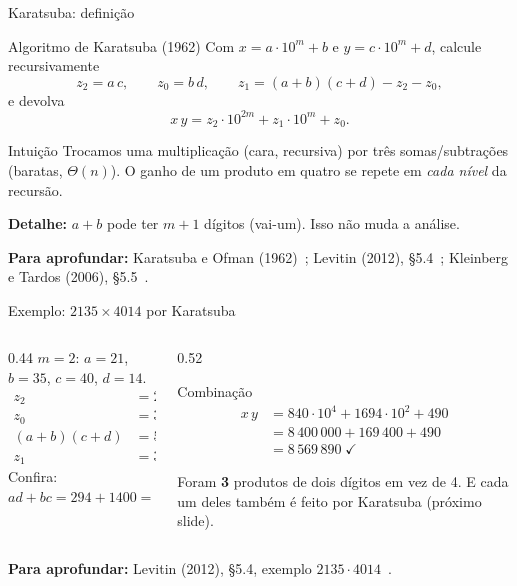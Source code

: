 \documentclass[aspectratio=169,xcolor=table]{beamer}
\newcommand{\fonte}[1]{%
  \vfill
  {\tiny\color{gray!55!black}\textbf{Para aprofundar:} #1\par}%
}
\begin{document}
\begin{frame}{Karatsuba: definição}
  \begin{block}{Algoritmo de Karatsuba (1962)}
    \scriptsize Com $x = a\cdot 10^m + b$ e $y = c\cdot 10^m + d$, calcule recursivamente
    \[
      z_2 = a\,c, \qquad z_0 = b\,d, \qquad z_1 = (a+b)(c+d) - z_2 - z_0,
    \]
    e devolva
    \[ x\,y = z_2\cdot 10^{2m} + z_1\cdot 10^m + z_0. \]
  \end{block}
  \begin{exampleblock}{Intuição}
    \scriptsize Trocamos uma multiplicação (cara, recursiva) por três somas/subtrações
    (baratas, $\Theta(n)$). O ganho de um produto em quatro se repete em \emph{cada nível}
    da recursão.
  \end{exampleblock}
  \scriptsize\textbf{Detalhe:} $a+b$ pode ter $m+1$ dígitos (vai-um). Isso não muda a análise.
  \fonte{Karatsuba e Ofman (1962)~\cite{karatsuba1963multiplication};
    Levitin (2012), \S 5.4~\cite{levitin2012introduction};
    Kleinberg e Tardos (2006), \S 5.5~\cite{kleinberg2006algorithm}.}
\end{frame}

\begin{frame}{Exemplo: $2135\times 4014$ por Karatsuba}
  \begin{columns}[T]
    \begin{column}{0.44\textwidth}
      \scriptsize
      $m=2$: \quad $a=21$, $b=35$, $c=40$, $d=14$.
      \[
        \begin{aligned}
          z_2 &= 21\cdot 40 = 840\\
          z_0 &= 35\cdot 14 = 490\\
          (a+b)(c+d) &= 56\cdot 54 = 3024\\
          z_1 &= 3024 - 840 - 490 = 1694
        \end{aligned}
      \]
      Confira: $ad+bc = 294+1400 = 1694$ \checkmark
    \end{column}
    \begin{column}{0.52\textwidth}
      \begin{exampleblock}{Combinação}
        \scriptsize
        \[
          \begin{aligned}
            x\,y &= 840\cdot 10^4 + 1694\cdot 10^2 + 490\\
                 &= 8\,400\,000 + 169\,400 + 490\\
                 &= 8\,569\,890 \;\checkmark
          \end{aligned}
        \]
      \end{exampleblock}
      \scriptsize Foram \textbf{3} produtos de dois dígitos em vez de 4. E cada um deles
      também é feito por Karatsuba (próximo slide).
    \end{column}
  \end{columns}
  \fonte{Levitin (2012), \S 5.4, exemplo $2135\cdot 4014$~\cite{levitin2012introduction}.}
\end{frame}
\end{document}
